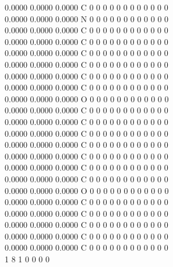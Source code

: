 \documentclass[11pt,titlepage,dvipdfmx,twoside]{article}
\begin{document}
\begin{oframed}
{    0.0000    0.0000    0.0000  C  0  0  0  0  0  0  0  0  0  0  0  0   \\
    0.0000    0.0000    0.0000  N  0  0  0  0  0  0  0  0  0  0  0  0   \\
    0.0000    0.0000    0.0000  C  0  0  0  0  0  0  0  0  0  0  0  0   \\
    0.0000    0.0000    0.0000  C  0  0  0  0  0  0  0  0  0  0  0  0   \\
    0.0000    0.0000    0.0000  C  0  0  0  0  0  0  0  0  0  0  0  0   \\
    0.0000    0.0000    0.0000  C  0  0  0  0  0  0  0  0  0  0  0  0   \\
    0.0000    0.0000    0.0000  C  0  0  0  0  0  0  0  0  0  0  0  0   \\
    0.0000    0.0000    0.0000  C  0  0  0  0  0  0  0  0  0  0  0  0   \\
    0.0000    0.0000    0.0000  O  0  0  0  0  0  0  0  0  0  0  0  0   \\
    0.0000    0.0000    0.0000  C  0  0  0  0  0  0  0  0  0  0  0  0   \\
    0.0000    0.0000    0.0000  C  0  0  0  0  0  0  0  0  0  0  0  0   \\
    0.0000    0.0000    0.0000  C  0  0  0  0  0  0  0  0  0  0  0  0   \\
    0.0000    0.0000    0.0000  C  0  0  0  0  0  0  0  0  0  0  0  0   \\
    0.0000    0.0000    0.0000  C  0  0  0  0  0  0  0  0  0  0  0  0   \\
    0.0000    0.0000    0.0000  C  0  0  0  0  0  0  0  0  0  0  0  0   \\
    0.0000    0.0000    0.0000  C  0  0  0  0  0  0  0  0  0  0  0  0   \\
    0.0000    0.0000    0.0000  O  0  0  0  0  0  0  0  0  0  0  0  0   \\
    0.0000    0.0000    0.0000  C  0  0  0  0  0  0  0  0  0  0  0  0   \\
    0.0000    0.0000    0.0000  C  0  0  0  0  0  0  0  0  0  0  0  0   \\
    0.0000    0.0000    0.0000  C  0  0  0  0  0  0  0  0  0  0  0  0   \\
    0.0000    0.0000    0.0000  C  0  0  0  0  0  0  0  0  0  0  0  0   \\
    0.0000    0.0000    0.0000  C  0  0  0  0  0  0  0  0  0  0  0  0   \\
  1  8  1  0  0  0  0                                                   \\
}
\end{oframed}
\end{document}
